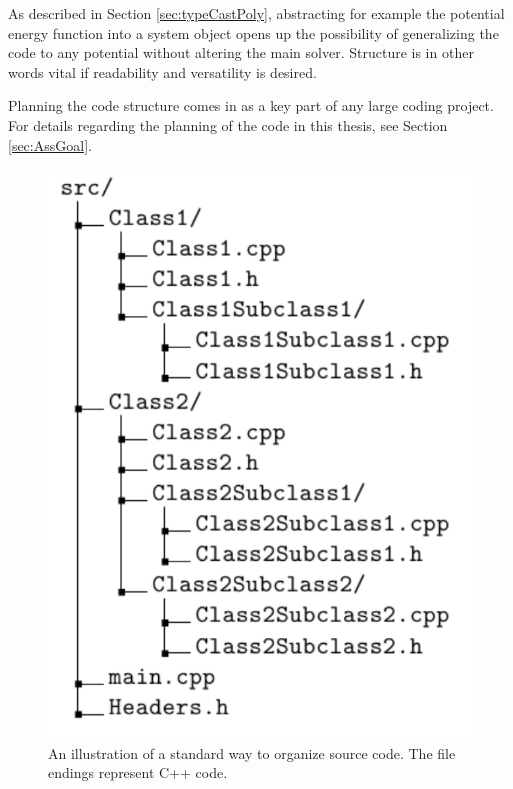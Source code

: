 As described in Section \ref{sec:typeCastPoly}, abstracting for example the potential energy function into a system object opens up the possibility of generalizing the code to any potential without altering the main solver. Structure is in other words vital if readability and versatility is desired. 

Planning the code structure comes in as a key part of any large coding project. For details regarding the planning of the code in this thesis, see Section \ref{sec:AssGoal}.

\begin{figure}[h]
 
 \begin{center}
  \includegraphics[scale=0.6]{../Graphics/SRCfolderStruct.pdf} 
 \end{center}

 \caption{An illustration of a standard way to organize source code. The file endings represent C++ code.}
 \label{FIG:SRCdirTree}
\end{figure}
